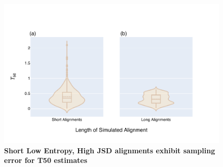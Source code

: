 \begin{figure}[!ht]
\centering
\includegraphics[width=\textwidth]{figures/plots/synthetic/T50/197113_332182_17210-seq_len.pdf}
\caption{\textbf{Short Low Entropy, High JSD alignments exhibit sampling error for T50 estimates }}
\label{fig:T50-short_long}
\end{figure}